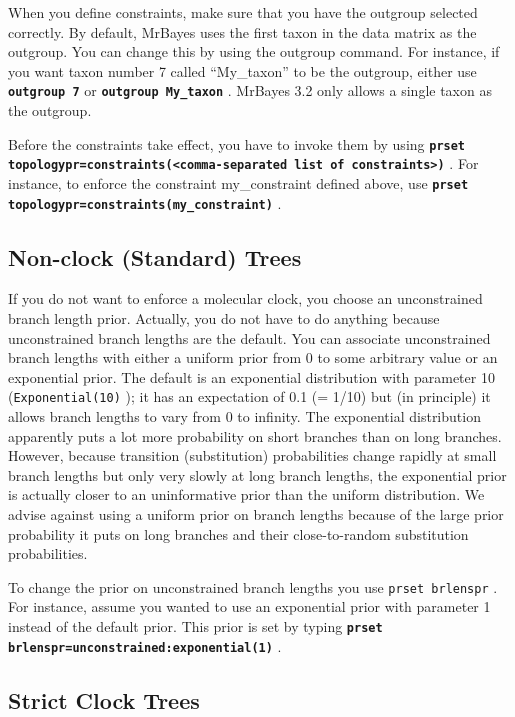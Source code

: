 \documentclass[12pt]{book}
\newcommand{\ttt}[1]{\texttt{#1} }
\newcommand{\tb}[1]{\ttt{\textbf{#1}} }
\begin{document}
When you define constraints, make sure that you have the outgroup selected correctly. By default,
MrBayes uses the first taxon in the data matrix as the outgroup. You can change this by using the
outgroup command. For instance, if you want taxon number 7 called “My\_taxon” to be the outgroup,
either use \tb{outgroup 7} or \tb{outgroup My\_taxon}.  MrBayes 3.2 only allows a single taxon as
the outgroup.

Before the constraints take effect, you have to invoke them by using \tb{prset
topologypr=constraints(<comma-separated list of constraints>)}. For instance, to enforce the
constraint my\_constraint defined above, use \tb{prset topologypr=constraints(my\_constraint)}.

\subsection{Non-clock (Standard) Trees}

If you do not want to enforce a molecular clock, you choose an unconstrained branch length prior.
Actually, you do not have to do anything because unconstrained branch lengths are the default. You
can associate unconstrained branch lengths with either a uniform prior from 0 to some arbitrary
value or an exponential prior. The default is an exponential distribution with parameter 10
(\ttt{Exponential(10)}); it has an expectation of 0.1 (= 1/10) but (in principle) it allows branch
lengths to vary from 0 to infinity. The exponential distribution apparently puts a lot more
probability on short branches than on long branches. However, because transition (substitution)
probabilities change rapidly at small branch lengths but only very slowly at long branch lengths,
the exponential prior is actually closer to an uninformative prior than the uniform distribution.
We advise against using a uniform prior on branch lengths because of the large prior probability it
puts on long branches and their close-to-random substitution probabilities.

To change the prior on unconstrained branch lengths you use \ttt{prset brlenspr}. For instance,
assume you wanted to use an exponential prior with parameter 1 instead of the default prior. This
prior is set by typing \tb{prset brlenspr=unconstrained:exponential(1)}.

\subsection{Strict Clock Trees}
\end{document}
